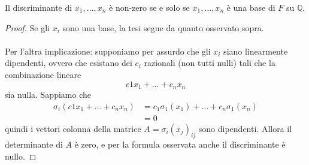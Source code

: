 \begin{proposizione}
	Il discriminante di $x_1,\dots,x_n$ è non-zero se e solo se $x_1,\dots,x_n$ è una base di $F$ su $\mathbb{Q}$.
\end{proposizione}
\begin{proof}
	Se gli $x_i$ sono una base, la tesi segue da quanto osservato sopra.
	\\ \\ Per l'altra implicazione: supponiamo per assurdo che gli $x_i$ siano linearmente dipendenti, ovvero che esistano dei $c_i$ razionali (non tutti nulli) tali che la combinazione lineare 
	\begin{equation*}
	c1x_1+\dots+c_nx_n
	\end{equation*}
	sia nulla. Sappiamo che 
	\begin{align*}
	\sigma_i\left(c1x_1+\dots+c_nx_n\right)
	&=c_1\sigma_1(x_1)+\dots+c_n\sigma_1(x_n)\\
	&=0
	\end{align*}
	quindi i vettori colonna della matrice $A=\sigma_i(x_j)_{ij}$ sono dipendenti. Allora il determinante di $A$ è zero, e per la formula osservata anche il discriminante è nullo.
\end{proof}

